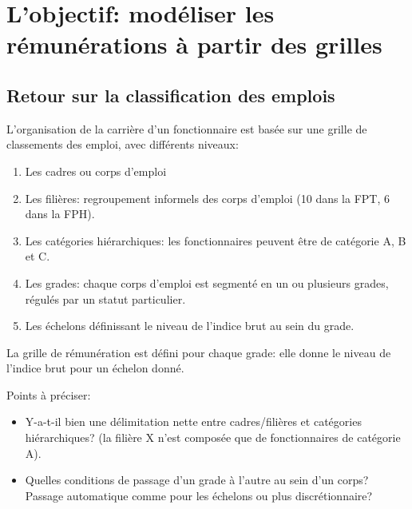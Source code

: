 \documentclass[11pt,a4paper]{article}
\begin{document}
\else \fi



\section{L'objectif: modéliser les rémunérations à partir des grilles}


\subsection*{Retour sur la classification des emplois}

L'organisation de la carrière d'un fonctionnaire est basée sur une grille de classements des emploi, avec différents niveaux:
 
\begin{enumerate}[leftmargin=2cm,parsep=0cm,itemsep=0cm,topsep=0cm]
\item Les cadres ou corps d'emploi
\item Les filières: regroupement informels des corps d'emploi (10 dans la FPT, 6 dans la FPH). 
\item Les catégories hiérarchiques: les fonctionnaires peuvent être de catégorie A, B et C. 
\item Les grades: chaque corps d'emploi est segmenté en un ou plusieurs grades, régulés par un statut particulier. 
\item Les échelons définissant le niveau de l'indice brut au sein du grade. 
\end{enumerate}


\vspace{0.5cm}

La grille de rémunération est défini pour chaque grade: elle donne le niveau de l'indice brut pour un échelon donné. 


Points à préciser: 
\begin{itemize}[leftmargin=1cm ,parsep=0cm,itemsep=0cm,topsep=0cm] 
\item Y-a-t-il bien une délimitation nette entre cadres/filières et catégories hiérarchiques? (la filière X n'est composée que de fonctionnaires de catégorie A). 
\item Quelles conditions de passage d'un grade à l'autre au sein d'un corps? Passage automatique comme pour les échelons ou plus discrétionnaire? 
\end{itemize}
\end{document}
